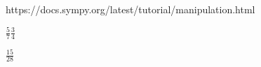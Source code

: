 \documentclass{article}
\begin{document}
https://docs.sympy.org/latest/tutorial/manipulation.html
 
\bigskip
$\frac{5}{7} \frac{3}{4}$
 
\bigskip
$\frac{15}{28}$
 
\bigskip
\end{document}
